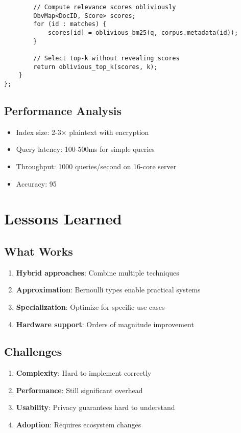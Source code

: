 \documentclass[11pt,final,hidelinks]{article}
\begin{document}
{\begin{verbatim}
        // Compute relevance scores obliviously
        ObvMap<DocID, Score> scores;
        for (id : matches) {
            scores[id] = oblivious_bm25(q, corpus.metadata(id));
        }
        
        // Select top-k without revealing scores
        return oblivious_top_k(scores, k);
    }
};
\end{verbatim}

\subsection{Performance Analysis}

\begin{itemize}
    \item Index size: 2-3× plaintext with encryption
    \item Query latency: 100-500ms for simple queries
    \item Throughput: 1000 queries/second on 16-core server
    \item Accuracy: 95%
\end{itemize}

\section{Lessons Learned}

\subsection{What Works}

\begin{enumerate}
    \item \textbf{Hybrid approaches}: Combine multiple techniques
    \item \textbf{Approximation}: Bernoulli types enable practical systems
    \item \textbf{Specialization}: Optimize for specific use cases
    \item \textbf{Hardware support}: Orders of magnitude improvement
\end{enumerate}

\subsection{Challenges}

\begin{enumerate}
    \item \textbf{Complexity}: Hard to implement correctly
    \item \textbf{Performance}: Still significant overhead
    \item \textbf{Usability}: Privacy guarantees hard to understand
    \item \textbf{Adoption}: Requires ecosystem changes
\end{enumerate}

}
\end{document}
